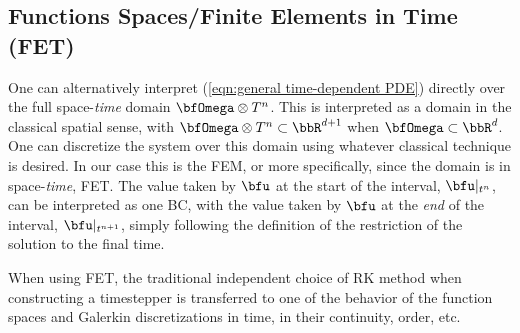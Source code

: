 \subsection*{Functions Spaces/Finite Elements in Time (FET)}\label{cha:FET}
    One can alternatively interpret (\ref{eqn:general time-dependent PDE}) directly over the full space-\emph{time} domain $\bfOmega\otimes T^{n}$. This is interpreted as a domain in the classical spatial sense, with $\bfOmega\otimes T^{n}  \subset  \bbR^{d + 1}$ when $\bfOmega  \subset  \bbR^{d}$. One can discretize the system over this domain using whatever classical technique is desired. In our case this is the FEM, or more specifically, since the domain is in space-\emph{time}, FET. The value taken by $\bfu$ at the start of the interval, $\bfu|_{t^{n}}$, can be interpreted as one BC, with the value taken by $\bfu$ at the \emph{end} of the interval, $\bfu|_{t^{n + 1}}$, simply following the definition of the restriction of the solution to the final time.
    
    When using FET, the traditional independent choice of RK method when constructing a timestepper is transferred to one of the behavior of the function spaces and Galerkin discretizations in time, in their continuity, order, etc.
    
